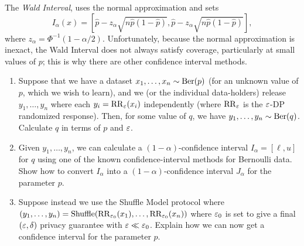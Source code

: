 \documentclass[11pt]{article}
\begin{document}
\begin{enumerate}[leftmargin=*]
The {\em Wald Interval}, uses the normal approximation and sets $$I_\alpha(x) = \left[\hat{p}-z_\alpha\sqrt{n\hat{p}(1-\hat{p})},\hat{p}-z_\alpha\sqrt{n\hat{p}(1-\hat{p})}\right],$$
where $z_\alpha = \Phi^{-1}(1-\alpha/2)$.
Unfortunately, because the normal approximation is inexact, the Wald Interval does not always satisfy coverage, particularly at small values of $p$; this is why there are other confidence interval methods. 

\begin{enumerate}

\item Suppose that we have a dataset $x_1,\ldots,x_n\sim \mathrm{Ber}(p)$ (for an unknown value of $p$, which we wish to learn), and we (or the individual data-holders) release $y_1,\ldots,y_n$ where each $y_i=\mathrm{RR}_\varepsilon(x_i)$ independently (where $\mathrm{RR}_\varepsilon$ is the $\varepsilon$-DP randomized response).  Then, for some value of $q$, we have $y_1,\ldots,y_n\sim \mathrm{Ber}(q)$.  Calculate $q$ in terms of $p$ and $\varepsilon$.

\item Given $y_1,\ldots,y_n$, we can calculate a $(1-\alpha)$-confidence interval $I_\alpha = [\ell,u]$ for $q$ using one of the known confidence-interval methods for Bernoulli data.  Show how to convert $I_\alpha$ into a $(1-\alpha)$-confidence interval $J_\alpha$ for the parameter $p$. 


\item Suppose instead we use the Shuffle Model protocol where $(y_1,\ldots,y_n) = \mathrm{Shuffle}(\mathrm{RR}_{\varepsilon_0}(x_1),\ldots,\mathrm{RR}_{\varepsilon_0}(x_n))$ where $\varepsilon_0$ is set to give a final $(\varepsilon,\delta)$ privacy guarantee with $\varepsilon \ll \varepsilon_0$.  Explain how we can now get a confidence interval for the parameter $p$.
\end{enumerate}
\end{enumerate}
\end{document}
